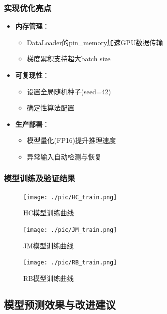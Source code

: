 \documentclass[a4paper,11pt]{ctexart}
\begin{document}
\subsubsection{实现优化亮点}
\begin{itemize}
\item \textbf{内存管理}：
  \begin{itemize}
  \item DataLoader的pin\_memory加速GPU数据传输
  \item 梯度累积支持超大batch size
  \end{itemize}
  
\item \textbf{可复现性}：
  \begin{itemize}
  \item 设置全局随机种子(seed=42)
  \item 确定性算法配置
  \end{itemize}
  
\item \textbf{生产部署}：
  \begin{itemize}
  \item 模型量化(FP16)提升推理速度
  \item 异常输入自动检测与恢复
  \end{itemize}
\end{itemize}
\subsubsection{模型训练及验证结果}
\FloatBarrier
\noindent
\begin{figure}[H]
  \centering
  \texttt{[image: ./pic/HC\_train.png]}
  \caption*{HC模型训练曲线}
\end{figure}
\begin{figure}[H]
  \centering
  \texttt{[image: ./pic/JM\_train.png]}
  \caption*{JM模型训练曲线}
\end{figure}
\begin{figure}[H]
  \centering
  \texttt{[image: ./pic/RB\_train.png]}
  \caption*{RB模型训练曲线}
\end{figure}




\subsection{模型预测效果与改进建议}
\end{document}

